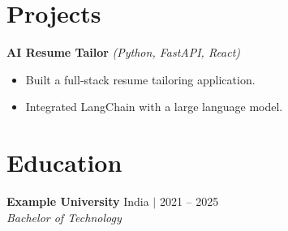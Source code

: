 \documentclass[10pt,letterpaper]{article}
\begin{document}
\section{Projects}
\textbf{AI Resume Tailor} \textit{(Python, FastAPI, React)}
\begin{itemize}
\item Built a full-stack resume tailoring application.
\item Integrated LangChain with a large language model.
\end{itemize}



\section{Education}
\textbf{Example University} \hfill India $|$ 2021 -- 2025 \\
\textit{Bachelor of Technology}
\end{document}
